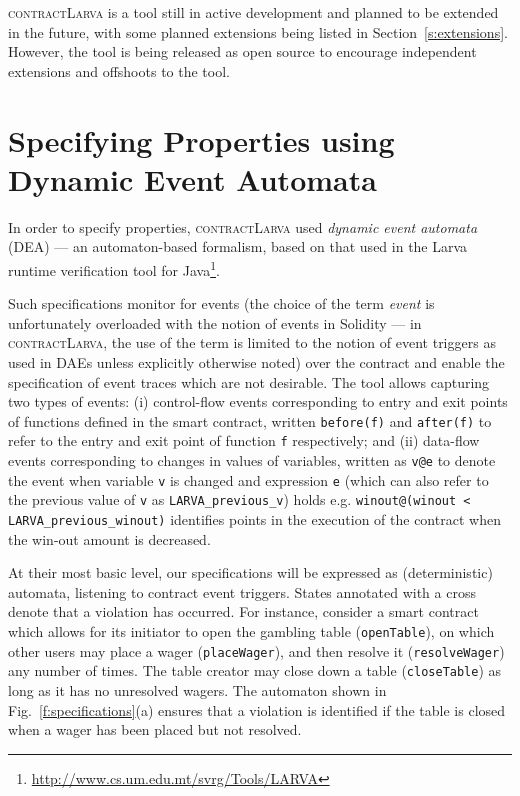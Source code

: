 \documentclass{article}
\newcommand{\contractlarva}{\textsc{contractLarva}\xspace}
\begin{document}
 \contractlarva is a tool still in active development and planned to be extended in the future, with some planned extensions being listed in Section~\ref{s:extensions}. However, the tool is being released as open source to encourage independent extensions and offshoots to the tool.

  \section{Specifying Properties using Dynamic Event Automata}
  \label{s:deas}

  In order to specify properties, \contractlarva used \emph{dynamic event automata} (DEA) --- an automaton-based formalism, based on that used in the Larva runtime verification tool for Java\footnote{\url{http://www.cs.um.edu.mt/svrg/Tools/LARVA}}. 
  
Such specifications monitor for events (the choice of the term \emph{event} is unfortunately overloaded with the notion of events in Solidity --- in \contractlarva, the use of the term is limited to the notion of event triggers as used in DAEs unless explicitly otherwise noted) over the contract and enable the specification of event traces which are not desirable. The tool allows capturing two types of events: (i) control-flow events corresponding to entry and exit points of functions defined in the smart contract, written \texttt{before(f)} and \texttt{after(f)} to refer to the entry and exit point of function \texttt{f} respectively; and (ii) data-flow events corresponding to changes in values of variables, written as \texttt{v@e} to denote the event when variable \texttt{v} is changed and expression \texttt{e} (which can also refer to the previous value of \texttt{v} as \texttt{LARVA\_previous\_v}) holds e.g. \texttt{winout@(winout < LARVA\_previous\_winout)} identifies points in the execution of the contract when the win-out amount is decreased. 

At their most basic level, our specifications will be expressed as (deterministic) automata, listening to contract event triggers. States annotated with a cross denote that a violation has occurred. For instance, consider a smart contract which allows for its initiator to open the gambling table (\texttt{openTable}), on which other users may place a wager (\texttt{placeWager}), and then resolve it (\texttt{resolveWager}) any number of times. The table creator may close down a table (\texttt{closeTable}) as long as it has no unresolved wagers. The automaton shown in Fig.~\ref{f:specifications}(a) ensures that a violation is identified if the table is closed when a wager has been placed but not resolved.
\end{document}
